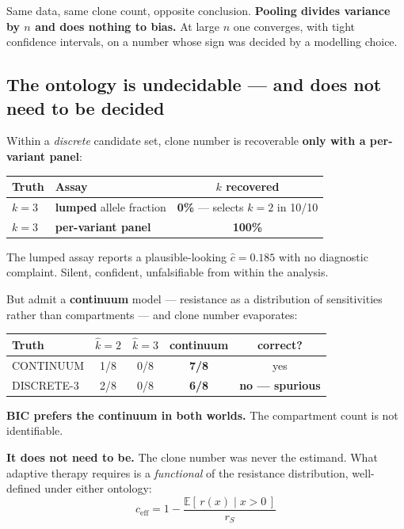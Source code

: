 \documentclass[11pt,a4paper]{article}
\newcommand{\ceff}{c_{\mathrm{eff}}}
\newcommand{\chat}{\hat{c}}
\begin{document}
Same data, same clone count, opposite conclusion. \textbf{Pooling divides variance
by $n$ and does nothing to bias.} At large $n$ one converges, with tight confidence
intervals, on a number whose sign was decided by a modelling choice.

\subsection{The ontology is undecidable --- and does not need to be decided}

Within a \emph{discrete} candidate set, clone number is recoverable \textbf{only
with a per-variant panel}:

\begin{center}
\begin{tabular}{llc}
\toprule
\textbf{Truth} & \textbf{Assay} & \textbf{$k$ recovered}\\
\midrule
$k=3$ & \textbf{lumped} allele fraction & \textbf{0\%} --- selects $k{=}2$ in 10/10\\
$k=3$ & \textbf{per-variant panel} & \textbf{100\%}\\
\bottomrule
\end{tabular}
\end{center}

The lumped assay reports a plausible-looking $\chat = 0.185$ with no diagnostic
complaint. Silent, confident, unfalsifiable from within the analysis.

But admit a \textbf{continuum} model --- resistance as a distribution of
sensitivities rather than compartments --- and clone number evaporates:

\begin{center}
\begin{tabular}{lcccc}
\toprule
\textbf{Truth} & \textbf{$\hat{k}=2$} & \textbf{$\hat{k}=3$} & \textbf{continuum} & \textbf{correct?}\\
\midrule
CONTINUUM & 1/8 & 0/8 & \textbf{7/8} & yes\\
DISCRETE-3 & 2/8 & 0/8 & \textbf{6/8} & \textbf{no --- spurious}\\
\bottomrule
\end{tabular}
\end{center}

\textbf{BIC prefers the continuum in both worlds.} The compartment count is not
identifiable.

\textbf{It does not need to be.} The clone number was never the estimand. What
adaptive therapy requires is a \emph{functional} of the resistance distribution,
well-defined under either ontology:
\begin{equation}
\ceff = 1 - \frac{\mathbb{E}\!\left[\, r(x) \mid x > 0 \,\right]}{r_S}
\end{equation}
\end{document}
